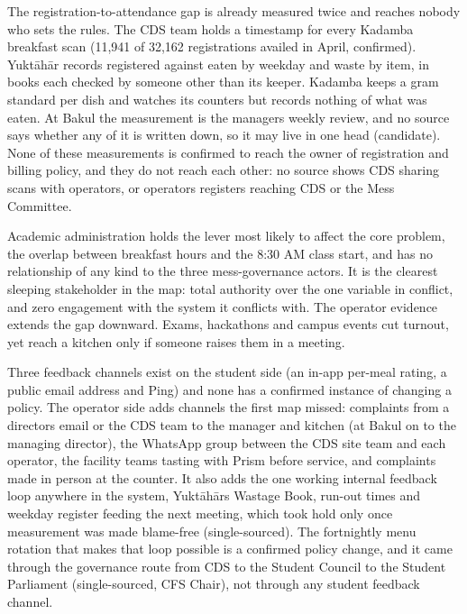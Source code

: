 \documentclass[
  10pt,
  table]{article}
\newcounter{none} %
\begin{document}
The registration-to-attendance gap is already measured twice and reaches nobody who sets the rules. The CDS team holds a timestamp for every Kadamba breakfast scan (11,941 of 32,162 registrations availed in April, confirmed). Yuktāhār records registered against eaten by weekday and waste by item, in books each checked by someone other than its keeper. Kadamba keeps a gram standard per dish and watches its counters but records nothing of what was eaten. At Bakul the measurement is the manager\textquotesingle s weekly review, and no source says whether any of it is written down, so it may live in one head (candidate). None of these measurements is confirmed to reach the owner of registration and billing policy, and they do not reach each other: no source shows CDS sharing scans with operators, or operators\textquotesingle{} registers reaching CDS or the Mess Committee.

Academic administration holds the lever most likely to affect the core problem, the overlap between breakfast hours and the 8:30 AM class start, and has no relationship of any kind to the three mess-governance actors. It is the clearest sleeping stakeholder in the map: total authority over the one variable in conflict, and zero engagement with the system it conflicts with. The operator evidence extends the gap downward. Exams, hackathons and campus events cut turnout, yet reach a kitchen only if someone raises them in a meeting.

Three feedback channels exist on the student side (an in-app per-meal rating, a public email address and Ping) and none has a confirmed instance of changing a policy. The operator side adds channels the first map missed: complaints from a director\textquotesingle s email or the CDS team to the manager and kitchen (at Bakul on to the managing director), the WhatsApp group between the CDS site team and each operator, the facility team\textquotesingle s tasting with Prism before service, and complaints made in person at the counter. It also adds the one working internal feedback loop anywhere in the system, Yuktāhār\textquotesingle s Wastage Book, run-out times and weekday register feeding the next meeting, which took hold only once measurement was made blame-free (single-sourced). The fortnightly menu rotation that makes that loop possible is a confirmed policy change, and it came through the governance route from CDS to the Student Council to the Student Parliament (single-sourced, CFS Chair), not through any student feedback channel.
\end{document}
